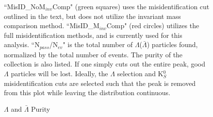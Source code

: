 \documentclass[../AnalysisNoteJBuxton.tex]{subfiles}
\begin{document}
\begin{figure}[h!]
{  ``MisID\_NoM$_{inv}$Comp" (green squares) uses the misidentification cut outlined in the text, but does not utilize the invariant mass comparison method.
  ``MisID\_M$_{inv}$Comp" (red circles) utilizes the full misidentification methods, and is currently used for this analysis.  
  ``N$_{pass}$/N$_{ev}$" is the total number of $\Lambda$($\bar{\Lambda}$) particles found, normalized by the total number of events.  The purity of the collection is also listed.   
If one simply cuts out the entire peak, good $\Lambda$ particles will be lost.
Ideally, the $\Lambda$ selection and K$^{0}_{S}$ misidentification cuts are selected such that the peak is removed from this plot while leaving the distribution continuous.}
  \label{fig:MassAssK0ShortHyp_cLamK0}
\end{figure}


\begin{figure}[h!]
  \centering
  \caption[$\Lambda$ and $\bar{\Lambda}$ Purity]{$\Lambda$ and $\bar{\Lambda}$ Purity}
  \label{fig:cLamPurity}
\end{figure}
\end{document}
